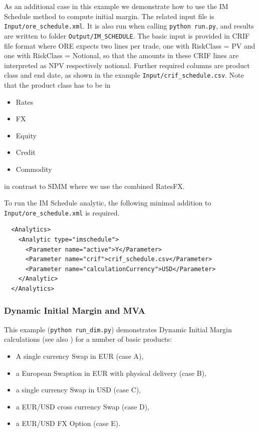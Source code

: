 As an additional case in this example we demonstrate how to use the IM Schedule method to compute initial margin.
The related input file is {\tt Input/ore\_schedule.xml}. It is also run when calling {\tt python run.py}, and results are written to folder 
{\tt Output/IM\_SCHEDULE}.
The basic input is provided in CRIF file format where ORE expects two lines per trade, one with RiskClass = PV and one with RiskClass = Notional, 
so that the  amounts in these CRIF lines are interpreted as NPV respectively notional. 
Further required columns are product class and end date, as shown in the example {\tt Input/crif\_schedule.csv}. Note that the product class has to be in
\begin{itemize}
  \item Rates
  \item FX
  \item Equity
  \item Credit
  \item Commodity
\end{itemize}
in contrast to SIMM where we use the combined RatesFX.

To run the IM Schedule analytic, the following minimal addition to {\tt Input/ore\_schedule.xml} is required.
\begin{verbatim}
  <Analytics>
    <Analytic type="imschedule">
      <Parameter name="active">Y</Parameter>
      <Parameter name="crif">crif_schedule.csv</Parameter>
      <Parameter name="calculationCurrency">USD</Parameter>
    </Analytic>
  </Analytics>
\end{verbatim}

\subsubsection{Dynamic Initial Margin and MVA}\label{example:initialmargin_dim}

This example ({\tt python run\_dim.py}) demonstrates Dynamic Initial Margin calculations (see also \cite{methods}) for a number of basic products:
\begin{itemize}
\item A single currency Swap in EUR (case A), 
\item a European Swaption in EUR with physical delivery (case B), 
\item a single currency Swap in USD (case C),
\item a EUR/USD cross currency Swap (case D),
\item a EUR/USD FX Option (case E).
\end{itemize}

